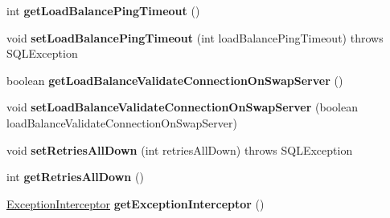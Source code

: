 \begin{DoxyCompactItemize}
\item 
\mbox{\label{classcom_1_1mysql_1_1jdbc_1_1jdbc2_1_1optional_1_1_connection_wrapper_a5c36289f40d3f5246299e274a3f45f2b}} 
int {\bfseries get\+Load\+Balance\+Ping\+Timeout} ()
\item 
\mbox{\label{classcom_1_1mysql_1_1jdbc_1_1jdbc2_1_1optional_1_1_connection_wrapper_ade6fa711552a86a7ad7249e4af4c96b9}} 
void {\bfseries set\+Load\+Balance\+Ping\+Timeout} (int load\+Balance\+Ping\+Timeout)  throws S\+Q\+L\+Exception 
\item 
\mbox{\label{classcom_1_1mysql_1_1jdbc_1_1jdbc2_1_1optional_1_1_connection_wrapper_a65fe2f0e028fe0f86a86eab048f29b8d}} 
boolean {\bfseries get\+Load\+Balance\+Validate\+Connection\+On\+Swap\+Server} ()
\item 
\mbox{\label{classcom_1_1mysql_1_1jdbc_1_1jdbc2_1_1optional_1_1_connection_wrapper_afd452494f723126ab37e5a1f56a244a1}} 
void {\bfseries set\+Load\+Balance\+Validate\+Connection\+On\+Swap\+Server} (boolean load\+Balance\+Validate\+Connection\+On\+Swap\+Server)
\item 
\mbox{\label{classcom_1_1mysql_1_1jdbc_1_1jdbc2_1_1optional_1_1_connection_wrapper_a4e3a8c2e1fba104aef88b68f2ad0c44a}} 
void {\bfseries set\+Retries\+All\+Down} (int retries\+All\+Down)  throws S\+Q\+L\+Exception 
\item 
\mbox{\label{classcom_1_1mysql_1_1jdbc_1_1jdbc2_1_1optional_1_1_connection_wrapper_ad078828be18aef72d32147a25b11095e}} 
int {\bfseries get\+Retries\+All\+Down} ()
\item 
\mbox{\label{classcom_1_1mysql_1_1jdbc_1_1jdbc2_1_1optional_1_1_connection_wrapper_ade6f5e7da063c5c1744c030c48f6bf71}} 
\mbox{\hyperlink{interfacecom_1_1mysql_1_1jdbc_1_1_exception_interceptor}{Exception\+Interceptor}} {\bfseries get\+Exception\+Interceptor} ()

\end{DoxyCompactItemize}
